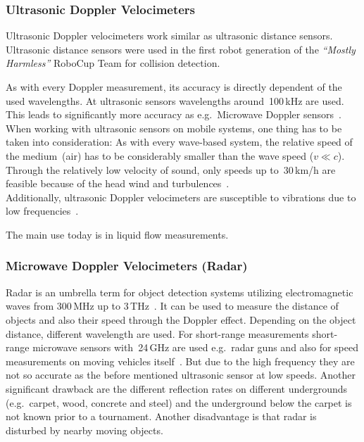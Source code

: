 \documentclass[12pt,a4paper]{article}
\newcommand{\MH}{\emph{``Mostly Harmless''} RoboCup Team\xspace}
\begin{document}
\subsubsection{Ultrasonic Doppler Velocimeters}

Ultrasonic Doppler velocimeters work similar as ultrasonic distance sensors.
Ultrasonic distance sensors were used in the first robot generation of the \MH for collision detection.

As with every Doppler measurement, its accuracy is directly dependent of the used wavelengths.
At ultrasonic sensors wavelengths around~100\,kHz are used. 
This leads to significantly more accuracy as e.g.\ Microwave Doppler sensors~\cite{ultrasonic}.\\
When working with ultrasonic sensors on mobile systems, one thing has to be taken into consideration: 
As with every wave-based system, the relative speed of the medium~(air) has to be considerably smaller than the wave speed ($v \ll c$).
Through the relatively low velocity of sound, only speeds up to~30\,km/h are feasible because of the head wind and turbulences~\cite{ultrasonic}.\\
Additionally, ultrasonic Doppler velocimeters are susceptible to vibrations due to low frequencies~\cite{agri}.

The main use today is in liquid flow measurements.



\subsubsection{Microwave Doppler Velocimeters (Radar)}

Radar is an umbrella term for object detection systems utilizing electromagnetic waves from 300\,MHz up to 3\,THz~\cite{nrt}.
It can be used to measure the distance of objects and also their speed through the Doppler effect.
Depending on the object distance, different wavelength are used.
For short-range measurements short-range microwave sensors with~24\,GHz are used e.g.\ radar guns and also for speed measurements on moving vehicles itself~\cite{s_r_radar}.
But due to the high frequency they are not so accurate as the before mentioned ultrasonic sensor at low speeds.
Another significant drawback are the different reflection rates on different undergrounds (e.g.\ carpet, wood, concrete and steel) and the underground below the carpet is not known prior to a tournament.
Another disadvantage is that radar is disturbed by nearby moving objects.
\end{document}
